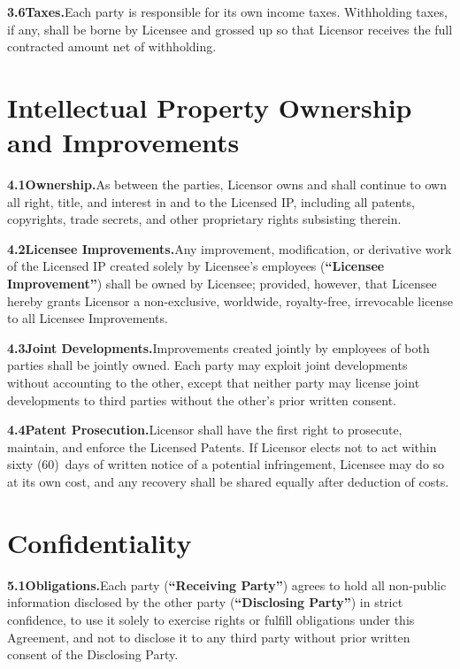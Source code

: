 \documentclass[11pt,a4paper]{article}
\newcommand{\defterm}[1]{\textbf{\color{NexaNavy}``#1''}}
\begin{document}
\textbf{3.6\enspace Taxes.}\enspace Each party is responsible for its own income taxes.
Withholding taxes, if any, shall be borne by Licensee and grossed up so that Licensor receives
the full contracted amount net of withholding.

\section{Intellectual Property Ownership and Improvements}

\textbf{4.1\enspace Ownership.}\enspace As between the parties, Licensor owns and shall
continue to own all right, title, and interest in and to the Licensed IP, including all
patents, copyrights, trade secrets, and other proprietary rights subsisting therein.

\textbf{4.2\enspace Licensee Improvements.}\enspace Any improvement, modification, or
derivative work of the Licensed IP created solely by Licensee's employees (\defterm{Licensee
Improvement}) shall be owned by Licensee; provided, however, that Licensee hereby grants
Licensor a non-exclusive, worldwide, royalty-free, irrevocable license to all Licensee
Improvements.

\textbf{4.3\enspace Joint Developments.}\enspace Improvements created jointly by employees of
both parties shall be jointly owned. Each party may exploit joint developments without
accounting to the other, except that neither party may license joint developments to third
parties without the other's prior written consent.

\textbf{4.4\enspace Patent Prosecution.}\enspace Licensor shall have the first right to
prosecute, maintain, and enforce the Licensed Patents. If Licensor elects not to act within
sixty (60)~days of written notice of a potential infringement, Licensee may do so at its own
cost, and any recovery shall be shared equally after deduction of costs.

\section{Confidentiality}

\textbf{5.1\enspace Obligations.}\enspace Each party (\defterm{Receiving Party}) agrees to
hold all non-public information disclosed by the other party (\defterm{Disclosing Party})
in strict confidence, to use it solely to exercise rights or fulfill obligations under this
Agreement, and not to disclose it to any third party without prior written consent of the
Disclosing Party.
\end{document}
